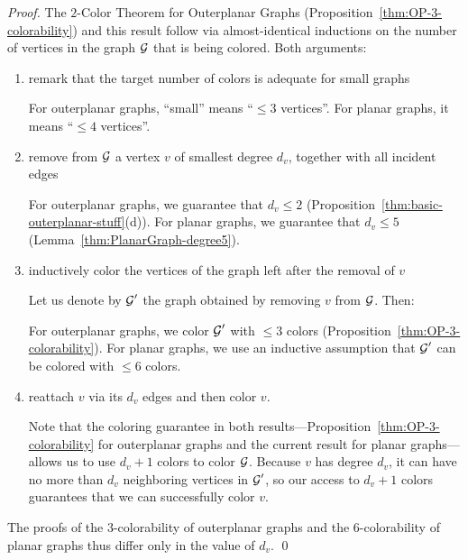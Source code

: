 \begin{proof}
The $2$-Color Theorem for Outerplanar Graphs (Proposition~\ref{thm:OP-3-colorability}) and this result follow via almost-identical inductions on the number of vertices in the graph $\mbox{$\cal G$}$ that is being colored.  Both arguments:
\begin{enumerate}
\item
remark that the target number of colors is adequate for small graphs

\smallskip

For outerplanar graphs, ``small'' means ``$\leq 3$ vertices''.  For planar graphs, it means ``$\leq 4$ vertices''.

\medskip\item
remove from $\mbox{$\cal G$}$ a vertex $v$ of smallest degree $d_v$, together with all incident edges

\smallskip

For outerplanar graphs, we guarantee that $d_v \leq 2$ (Proposition~\ref{thm:basic-outerplanar-stuff}(d)).  For planar graphs, we guarantee that $d_v \leq 5$ (Lemma~\ref{thm:PlanarGraph-degree5}).

\medskip\item
inductively color the vertices of the graph left after the removal of $v$

\smallskip

Let us denote by $\mbox{$\cal G$}'$ the graph obtained by removing $v$ from $\mbox{$\cal G$}$.  Then: 

For outerplanar graphs, we color $\mbox{$\cal G$}'$ with $\leq 3$ colors (Proposition~\ref{thm:OP-3-colorability}).  For planar graphs, we use an inductive assumption that $\mbox{$\cal G$}'$ can be colored with $\leq 6$ colors. 

\medskip\item
reattach $v$ via its $d_v$ edges and then color $v$.

\smallskip

Note that the coloring guarantee in both results---Proposition~\ref{thm:OP-3-colorability} for outerplanar graphs and the current result for planar graphs---allows us to use $d_v +1$ colors to color $\mbox{$\cal G$}$.  Because $v$ has degree $d_v$, it can have no more than $d_v$ neighboring vertices in $\mbox{$\cal G$}'$, so our access to $d_v +1$ colors guarantees that we can successfully color $v$.
\end{enumerate}
The proofs of the $3$-colorability of outerplanar graphs and the $6$-colorability of planar graphs thus differ only in the value of $d_v$.  \qed
\end{proof}


